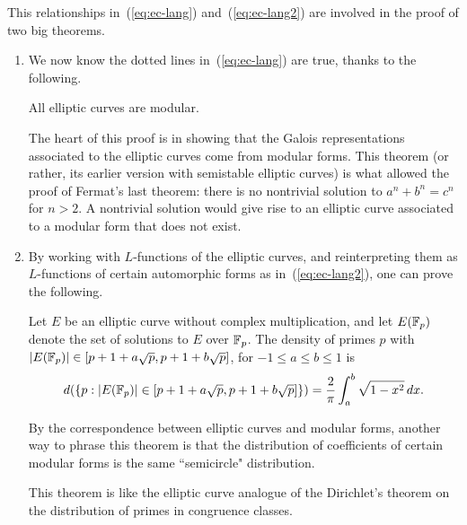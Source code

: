 This relationships in~(\ref{eq:ec-lang}) and~(\ref{eq:ec-lang2})  are involved in the proof of two big theorems.
\begin{enumerate}
\item We now know the dotted lines in~(\ref{eq:ec-lang}) are true, thanks to the following.
\begin{thm}
All elliptic curves are modular.
\end{thm}
The heart of this proof is in showing that the Galois representations associated to the elliptic curves come from modular forms. This theorem (or rather, its earlier version with semistable elliptic curves) is what allowed the proof of Fermat's last theorem: there is no nontrivial solution to $a^n+b^n=c^n$ for $n>2$. A nontrivial solution would give rise to an elliptic curve associated to a modular form that does not exist.
\item 
By working with $L$-functions of the elliptic curves, and reinterpreting them as $L$-functions of certain automorphic forms as in~(\ref{eq:ec-lang2}), one can prove the following. 
\begin{thm}
Let $E$ be an elliptic curve without complex multiplication, and let $E(\mathbb{F}_p)$ denote the set of solutions to $E$ over $\mathbb{F}_p$. The density of primes $p$ with $|E(\mathbb{F}_p)|\in [p+1+a\sqrt{p},p+1+b\sqrt{p}]$, for $-1\le a\le b\le 1$ is
\[
d(\left\{{p}:{|E(\mathbb{F}_p)|\in [p+1+a\sqrt{p},p+1+b\sqrt{p}]}\right\})=\frac{2}{\pi}\int_a^b \sqrt{1-x^2}\,dx.
\]
\end{thm}
By the correspondence between elliptic curves and modular forms, another way to phrase this theorem is that the distribution of coefficients of certain modular forms is the same ``semicircle" distribution. 

This theorem is like the elliptic curve analogue of the Dirichlet's theorem on the distribution of primes in congruence classes.
\end{enumerate}
